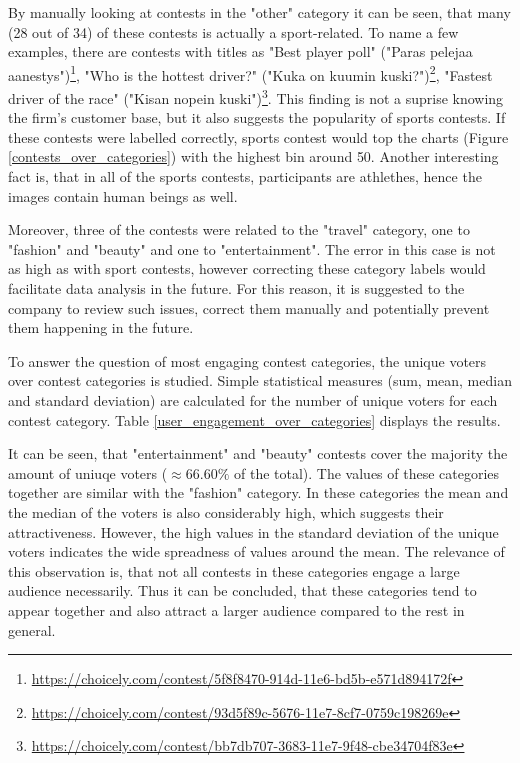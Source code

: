     By manually looking at contests in the "other" category it can be seen, that many (28 out of 34) of these contests is actually a sport-related. To name a few examples, there are contests with titles as "Best player poll" ("Paras pelejaa aanestys")\footnote{\url{https://choicely.com/contest/5f8f8470-914d-11e6-bd5b-e571d894172f}}, "Who is the hottest driver?" ("Kuka on kuumin kuski?")\footnote{\url{https://choicely.com/contest/93d5f89c-5676-11e7-8cf7-0759c198269e}}, "Fastest driver of the race" ("Kisan nopein kuski")\footnote{\url{https://choicely.com/contest/bb7db707-3683-11e7-9f48-cbe34704f83e}}. This finding is not a suprise knowing the firm's customer base, but it also suggests the popularity of sports contests. If these contests were labelled correctly, sports contest would top the charts (Figure \ref{contests_over_categories}) with the highest bin around 50. Another interesting fact is, that in all of the sports contests, participants are athlethes, hence the images contain human beings as well. 
    
    Moreover, three of the contests were related to the "travel" category, one to "fashion" and "beauty" and one to "entertainment". The error in this case is not as high as with sport contests, however correcting these category labels would facilitate data analysis in the future. For this reason, it is suggested to the company to review such issues, correct them manually and potentially prevent them happening in the future. 
    
    To answer the question of most engaging contest categories, the unique voters over contest categories is studied. Simple statistical measures (sum, mean, median and standard deviation) are calculated for the number of unique voters for each contest category. Table \ref{user_engagement_over_categories} displays the results.
    
    It can be seen, that "entertainment" and "beauty" contests cover the majority the amount of uniuqe voters ($\approx 66.60 \%$ of the total). The values of these categories together are similar with the  "fashion" category. In these categories the mean and the median of the voters is also considerably high, which suggests their attractiveness. However, the high values in the standard deviation of the unique voters indicates the wide spreadness of values around the mean. The relevance of this observation is, that not all contests in these categories engage a large audience necessarily. Thus it can be concluded, that these categories tend to appear together and also attract a larger audience compared to the rest in general. 

